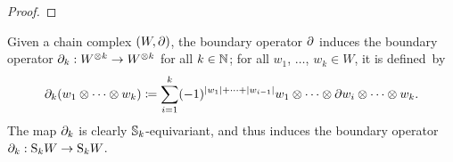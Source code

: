 \documentclass[\MainFolder/Text.tex]{subfiles}
\begin{document}
\begin{proof}
\end{proof}

Given a chain complex $(W,\partial)$, the boundary operator $\partial$ induces the boundary operator $\partial_k : W^{\otimes k} \rightarrow W^{\otimes k}$ for all $k\in \mathbb{N}$; for all $w_1$, $\dotsc$, $w_k\in W$, it is defined~by
\begin{equation}\label{Eq:BddExt}
\partial_k(w_1 \otimes \dotsb \otimes w_k)\coloneqq \sum_{i=1}^k (-1)^{|w_1| + \dotsb + |w_{i-1}|} w_1 \otimes \dotsb \otimes \partial w_i \otimes \dotsb \otimes w_k.
\end{equation}
The map $\partial_k$ is clearly $\mathbb{S}_k$-equivariant, and thus induces the boundary operator $\partial_k : \mathrm{S}_k W \rightarrow \mathrm{S}_k W$.
\end{document}
